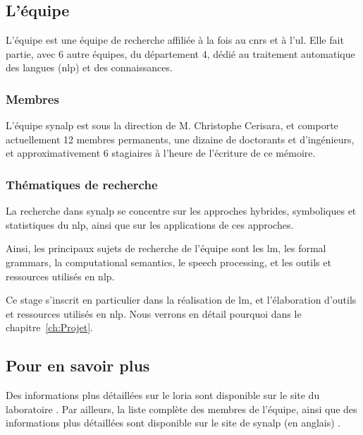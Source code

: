 \subsection{L'équipe }
L'équipe  est une équipe de recherche affiliée à la fois au \gls{cnrs} et à l'\gls{ul}.
Elle fait partie, avec 6 autre équipes, du département 4, dédié au traitement automatique des langues (\gls{nlp}) et des connaissances.

\subsubsection*{Membres}
L'équipe \gls{synalp} est sous la direction de M. Christophe Cerisara, et comporte actuellement 12 membres permanents, une dizaine de doctorants et d'ingénieurs, et approximativement 6 stagiaires à l'heure de l'écriture de ce mémoire.

\subsubsection*{Thématiques de recherche}
La recherche dans \gls{synalp} se concentre sur les approches hybrides, symboliques et statistiques du \gls{nlp}, ainsi que sur les applications de ces approches.

Ainsi, les principaux sujets de recherche de l'équipe sont les \gls{lm}, les \gls{formal grammars}, la \gls{computational semantics}, le \gls{speech processing}, et les outils et ressources utilisés en \gls{nlp}.

Ce stage s'inscrit en particulier dans la réalisation de \gls{lm}, et l'élaboration d'outils et ressources utilisés en \gls{nlp}. Nous verrons en détail pourquoi dans le chapitre~\ref{ch:Projet}.

\subsection*{Pour en savoir plus}
Des informations plus détaillées sur le \gls{loria} sont disponible sur {le site du laboratoire }.
Par ailleurs, la liste complète des membres de l'équipe, ainsi que des informations plus détaillées sont disponible sur {le site de \gls{synalp} (en anglais) }.


